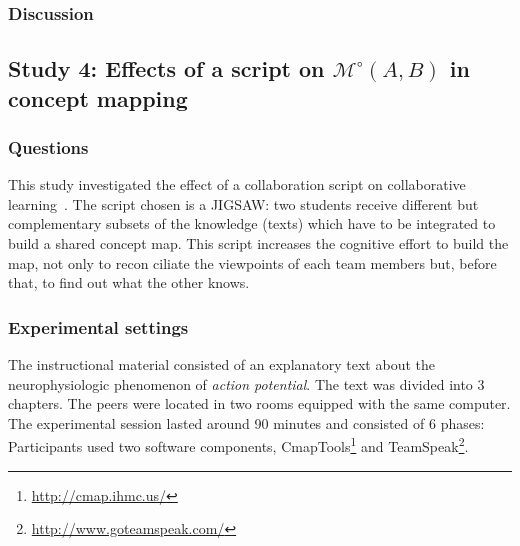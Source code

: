 \documentclass[twocolumn]{article}
\newcommand{\gModel}[2]{{$\mathcal{M}^{\circ}(#1, #2)$}}
\begin{document}
\subsubsection*{Discussion}





\subsection{Study 4:  Effects of a script on \gModel{A}{B}  in concept mapping}

\subsubsection*{Questions}

This study investigated the effect of a collaboration script on collaborative
learning~\citep{molinari2008effects}. The script chosen is a JIGSAW: two students
receive different but complementary subsets of the knowledge (texts) which have
to be integrated to build a shared concept map.  This script increases the
cognitive effort to build the map, not only to recon ciliate the viewpoints of
each team members but, before that, to find out what the other knows. 

\subsubsection*{Experimental settings}

The instructional material consisted of an explanatory text about the
neurophysiologic phenomenon of \emph{action potential}. The text was divided
into 3 chapters. The peers were located in two rooms equipped with the same
computer.  The experimental session lasted around 90 minutes and consisted of 6
phases: Participants used two software components, {\sc
CmapTools}\footnote{\url{http://cmap.ihmc.us/}} and {\sc
TeamSpeak}\footnote{\url{http://www.goteamspeak.com/}}.
\end{document}
